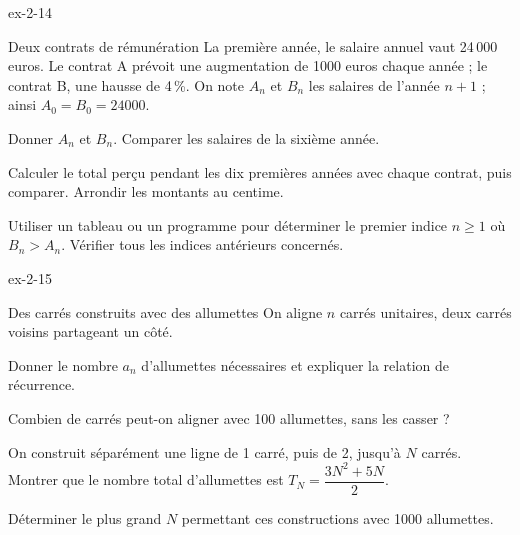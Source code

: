 \begin{blocLivre}{ex-2-14}
\begin{exercice}[3]{Deux contrats de rémunération}
La première année, le salaire annuel vaut 24\,000 euros. Le contrat A prévoit
une augmentation de 1000 euros chaque année ; le contrat B, une hausse de 4\,\%.
On note $A_n$ et $B_n$ les salaires de l'année $n+1$ ; ainsi $A_0=B_0=24000$.
\begin{questions}
\item Donner $A_n$ et $B_n$. Comparer les salaires de la sixième année.
\item Calculer le total perçu pendant les dix premières années avec chaque contrat,
puis comparer. Arrondir les montants au centime.
\item Utiliser un tableau ou un programme pour déterminer le premier indice $n\geq1$
où $B_n>A_n$. Vérifier tous les indices antérieurs concernés.
\end{questions}
\end{exercice}
\end{blocLivre}
\begin{blocLivre}{ex-2-15}
\begin{exercice}[3]{Des carrés construits avec des allumettes}
On aligne $n$ carrés unitaires, deux carrés voisins partageant un côté.
\begin{center}\end{center}
\begin{questions}
\item Donner le nombre $a_n$ d'allumettes nécessaires et expliquer la relation de récurrence.
\item Combien de carrés peut-on aligner avec 100 allumettes, sans les casser ?
\item On construit séparément une ligne de 1 carré, puis de 2, jusqu'à $N$ carrés.
Montrer que le nombre total d'allumettes est $T_N=\dfrac{3N^2+5N}{2}$.
\item Déterminer le plus grand $N$ permettant ces constructions avec 1000 allumettes.
\end{questions}
\end{exercice}
\end{blocLivre}
